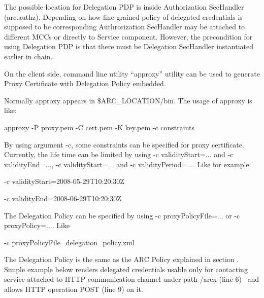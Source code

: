 \documentclass{article}
\begin{document}
{\color{black}
The possible location for Delegation PDP is inside Authorization
SecHandler (arc.authz). Depending on how fine grained policy of
delegated credentials is supposed to be corresponding Authrorization
SecHandler may be attached to different MCCs or directly to Service
component. However, the precondition for using Delegation PDP is that
there must be Delegation SecHandler instantiated earlier in chain.}

{\color{black}
On the client side, command line utility
{\textquotedblleft}approxy{\textquotedblright} utility can be used to
generate Proxy Certificate with Delegation Policy embedded.}

{\color{black}
Normally approxy appears in \$ARC\_LOCATION/bin. The usage of approxy is
like:}

{\color{black}
approxy -P proxy.pem -C cert.pem -K key.pem -c constraints}

{\color{black}
By using argument {\textquotedbl}-c{\textquotedbl}, some constraints can
be specified for proxy certificate. Currently, the life time can be
limited by using {\textquotedbl}-c validityStart=...{\textquotedbl} and
{\textquotedbl}-c validityEnd=...{\textquotedbl}, {\textquotedbl}-c
validityStart=...{\textquotedbl} and {\textquotedbl}-c
validityPeriod=...{\textquotedbl}. Like for example }

{\color{black}
{}-c validityStart=2008-05-29T10:20:30Z}

{\color{black}
{}-c validityEnd=2008-06-29T10:20:30Z}

{\color{black}
The Delegation Policy can be specified by using {\textquotedbl}-c
proxyPolicyFile=...{\textquotedbl} or {\textquotedbl}-c
proxyPolicy=...{\textquotedbl}. Like }

{\color{black}
{}-c proxyPolicyFile=delegation\_policy.xml}

{\upshape\color{black}
The Delegation Policy is the same as the ARC Policy explained in section
. Simple example below renders delegated credentials usable only for
contacting service attached to HTTP communication channel under path
/arex (line 6) \ and allows HTTP operation POST (line 9) on it. }
\end{document}
